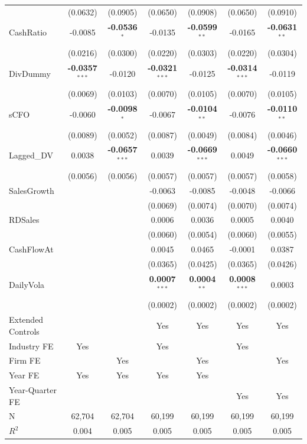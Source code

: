 \begin{landscape}
\begin{table}[H]
\begin{tabular}{lcccccc}
 & (0.0632) & (0.0905) & (0.0650) & (0.0908) & (0.0650) & (0.0910) \\
CashRatio & -0.0085 & \textbf{-0.0536}$^{*}$ & -0.0135 & \textbf{-0.0599}$^{**}$ & -0.0165 & \textbf{-0.0631}$^{**}$ \\
 & (0.0216) & (0.0300) & (0.0220) & (0.0303) & (0.0220) & (0.0304) \\
DivDummy & \textbf{-0.0357}$^{***}$ & -0.0120 & \textbf{-0.0321}$^{***}$ & -0.0125 & \textbf{-0.0314}$^{***}$ & -0.0119 \\
 & (0.0069) & (0.0103) & (0.0070) & (0.0105) & (0.0070) & (0.0105) \\
sCFO & -0.0060 & \textbf{-0.0098}$^{*}$ & -0.0067 & \textbf{-0.0104}$^{**}$ & -0.0076 & \textbf{-0.0110}$^{**}$ \\
 & (0.0089) & (0.0052) & (0.0087) & (0.0049) & (0.0084) & (0.0046) \\
Lagged\_DV & 0.0038 & \textbf{-0.0657}$^{***}$ & 0.0039 & \textbf{-0.0669}$^{***}$ & 0.0049 & \textbf{-0.0660}$^{***}$ \\
 & (0.0056) & (0.0056) & (0.0057) & (0.0057) & (0.0057) & (0.0058) \\
SalesGrowth &  &  & -0.0063 & -0.0085 & -0.0048 & -0.0066 \\
 &  &  & (0.0069) & (0.0074) & (0.0070) & (0.0074) \\
RDSales &  &  & 0.0006 & 0.0036 & 0.0005 & 0.0040 \\
 &  &  & (0.0060) & (0.0054) & (0.0060) & (0.0055) \\
CashFlowAt &  &  & 0.0045 & 0.0465 & -0.0001 & 0.0387 \\
 &  &  & (0.0365) & (0.0425) & (0.0365) & (0.0426) \\
DailyVola &  &  & \textbf{0.0007}$^{***}$ & \textbf{0.0004}$^{**}$ & \textbf{0.0008}$^{***}$ & 0.0003 \\
 &  &  & (0.0002) & (0.0002) & (0.0002) & (0.0002) \\
\midrule
Extended Controls &  &  & Yes & Yes & Yes & Yes \\
Industry FE & Yes &  & Yes &  & Yes &  \\
Firm FE &  & Yes &  & Yes &  & Yes \\
Year FE & Yes & Yes & Yes & Yes &  &  \\
Year-Quarter FE &  &  &  &  & Yes & Yes \\
\midrule
N & 62,704 & 62,704 & 60,199 & 60,199 & 60,199 & 60,199 \\
$R^2$ & 0.004 & 0.005 & 0.005 & 0.005 & 0.005 & 0.005 \\

\end{tabular}
\end{table}
\end{landscape}
